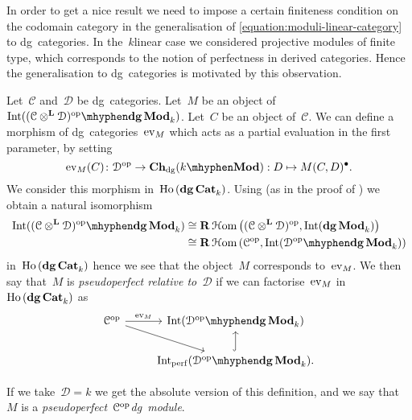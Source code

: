 \begin{refsection}
In order to get a nice result we need to impose a certain finiteness condition on the codomain category in the generalisation of \eqref{equation:moduli-linear-category} to dg~categories. In the~$k$\dash linear case we considered projective modules of finite type, which corresponds to the notion of perfectness in derived categories. Hence the generalisation to dg~categories is motivated by this observation.

\begin{definition}
  Let~$\mathcal{C}$ and~$\mathcal{D}$ be dg~categories. Let~$M$ be an object of~$\Int(\dgMod{(\mathcal{C}\otimes^{\mathbf{L}}\mathcal{D})^\opp}_k)$. Let~$C$ be an object of~$\mathcal{C}$. We can define a morphism of dg~categories~$\operatorname{ev}_M$ which acts as a partial evaluation in the first parameter, by setting
  \begin{equation}
    \ev_M(C)\colon\mathcal{D}^\opp\to\Ch_\dg(k\mhyphen\Mod):D\mapsto M(C,D)^\bullet.
  \end{equation}
  We consider this morphism in~$\operatorname{\mathrm{Ho} \,}(\mathbf{dg\,Cat}_k)$. Using \cite[theorem 6.1]{toen} (as in the proof of \cite[corollary 7.6]{toen}) we obtain a natural isomorphism
  \begin{equation}
    \begin{aligned}
      \Int(\dgMod{(\mathcal{C}\otimes^{\mathbf{L}}\mathcal{D})^\opp}_k)&\cong\RRRHHom\left( (\mathcal{C}\otimes^{\mathbf{L}}\mathcal{D})^\opp,\Int(\dgMod_k) \right) \\
      &\cong\RRRHHom\left( \mathcal{C}^\opp,\Int(\dgMod{\mathcal{D}^\opp}_k) \right)
    \end{aligned}
  \end{equation}
  in~$\operatorname{\mathrm{Ho} \,}(\mathbf{dg\,Cat}_k)$ hence we see that the object~$M$ corresponds to~$\operatorname{ev}_M$. We then say that~$M$ is \emph{pseudoperfect relative to~$\mathcal{D}$} if we can factorise~$\operatorname{ev}_M$ in~$\operatorname{\mathrm{Ho} \,}(\mathbf{dg\,Cat}_k)$ as
  \begin{equation}
    \begin{tikzcd}
      \mathcal{C}^\opp \arrow{r}{\ev_M} \arrow{rd} & \Int(\dgMod{\mathcal{D}^\opp}_k) \\
      & \Int_\perf(\dgMod{\mathcal{D}^\opp}_k) \arrow[hook]{u}.
    \end{tikzcd}
  \end{equation}
\end{definition}
If we take~$\mathcal{D}=k$ we get the absolute version of this definition, and we say that $M$ is a \emph{pseudoperfect~$\mathcal{C}^{\mathrm{op}}$\dash dg~module}.


\end{refsection}
